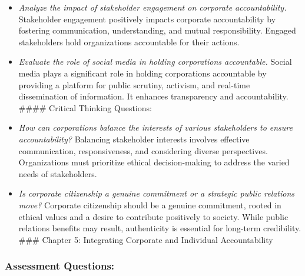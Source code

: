\documentclass[
  letterpaper,
  DIV=11,
  numbers=noendperiod]{scrreprt}
\begin{document}
\begin{itemize}
\item
  \emph{Analyze the impact of stakeholder engagement on corporate
  accountability.} Stakeholder engagement positively impacts corporate
  accountability by fostering communication, understanding, and mutual
  responsibility. Engaged stakeholders hold organizations accountable
  for their actions.
\item
  \emph{Evaluate the role of social media in holding corporations
  accountable.} Social media plays a significant role in holding
  corporations accountable by providing a platform for public scrutiny,
  activism, and real-time dissemination of information. It enhances
  transparency and accountability. \#\#\#\# Critical Thinking Questions:
\item
  \emph{How can corporations balance the interests of various
  stakeholders to ensure accountability?} Balancing stakeholder
  interests involves effective communication, responsiveness, and
  considering diverse perspectives. Organizations must prioritize
  ethical decision-making to address the varied needs of stakeholders.
\item
  \emph{Is corporate citizenship a genuine commitment or a strategic
  public relations move?} Corporate citizenship should be a genuine
  commitment, rooted in ethical values and a desire to contribute
  positively to society. While public relations benefits may result,
  authenticity is essential for long-term credibility. \#\#\# Chapter 5:
  Integrating Corporate and Individual Accountability
\end{itemize}

\subsubsection{Assessment Questions:}\label{assessment-questions-10}
\end{document}
